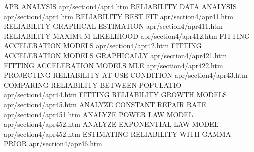 APR ANALYSIS                            apr/section4/apr4.htm
RELIABILITY DATA ANALYSIS               apr/section4/apr4.htm
RELIABILITY BEST FIT                    apr/section4/apr41.htm
RELIABILITY GRAPHICAL ESTIMATION        apr/section4/apr411.htm
RELIABILITY MAXIMUM LIKELIHOOD          apr/section4/apr412.htm
FITTING ACCELERATION MODELS             apr/section4/apr42.htm
FITTING ACCELERATION MODELS GRAPHICALLY apr/section4/apr421.htm
FITTING ACCELERATION MODELS MLE         apr/section4/apr422.htm
PROJECTING RELIABILITY AT USE CONDITION apr/section4/apr43.htm
COMPARING RELIABILITY BETWEEN POPULATIO apr/section4/apr44.htm
FITTING RELIABILITY GROWTH MODELS       apr/section4/apr45.htm
ANALYZE CONSTANT REPAIR RATE            apr/section4/apr451.htm
ANALYZE POWER LAW MODEL                 apr/section4/apr452.htm
ANALYZE EXPONENTIAL LAW MODEL           apr/section4/apr452.htm
ESTIMATING RELIABILITY WITH GAMMA PRIOR apr/section4/apr46.htm
